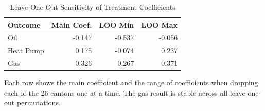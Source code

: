 \begin{table}[!h]
\centering
\caption{\label{tab:loo}Leave-One-Out Sensitivity of Treatment Coefficients}
\centering
\begin{threeparttable}
\begin{tabular}[t]{lrrr}
\toprule
Outcome & Main Coef. & LOO Min & LOO Max\\
\midrule
Oil & -0.147 & -0.537 & -0.056\\
Heat Pump & 0.175 & -0.074 & 0.237\\
Gas & 0.326 & 0.267 & 0.371\\
\bottomrule
\end{tabular}
\begin{tablenotes}
\item Each row shows the main coefficient and the range of coefficients when dropping each of the 26 cantons one at a time. The gas result is stable across all leave-one-out permutations.
\end{tablenotes}
\end{threeparttable}
\end{table}
